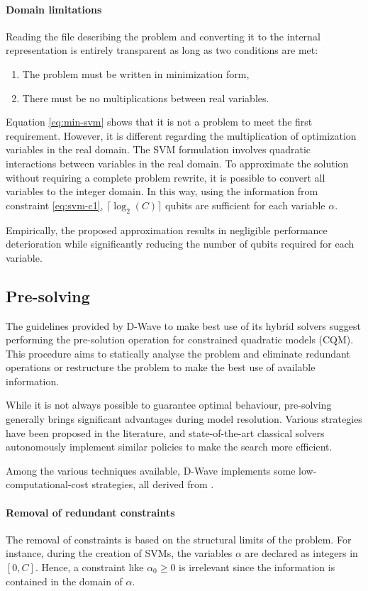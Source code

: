 \paragraph{Domain limitations} Reading the file describing the problem and converting it to the internal representation is entirely transparent as long as two conditions are met:
\begin{enumerate}
    \item The problem must be written in minimization form,
    \item There must be no multiplications between real variables.
\end{enumerate}
Equation \ref{eq:min-svm} shows that it is not a problem to meet the first requirement. However, it is different regarding the multiplication of optimization variables in the real domain. The SVM formulation involves quadratic interactions between variables in the real domain. To approximate the solution without requiring a complete problem rewrite, it is possible to convert all variables to the integer domain. In this way, using the information from constraint \ref{eq:svm-c1}, $\lceil\log_2(C)\rceil$ qubits are sufficient for each variable $\alpha$.

Empirically, the proposed approximation results in negligible performance deterioration while significantly reducing the number of qubits required for each variable.

\subsection{Pre-solving}

The guidelines provided by D-Wave to make best use of its hybrid solvers suggest performing the pre-solution operation for constrained quadratic models (CQM). This procedure aims to statically analyse the problem and eliminate redundant operations or restructure the problem to make the best use of available information.

While it is not always possible to guarantee optimal behaviour, pre-solving generally brings significant advantages during model resolution. Various strategies have been proposed in the literature, and state-of-the-art classical solvers autonomously implement similar policies to make the search more efficient.

Among the various techniques available, D-Wave implements some low-computational-cost strategies, all derived from \cite{PRESOLVE}.

\paragraph{Removal of redundant constraints} The removal of constraints is based on the structural limits of the problem. For instance, during the creation of SVMs, the variables $\alpha$ are declared as integers in $[0, C]$. Hence, a constraint like $\alpha_0 \geq 0$ is irrelevant since the information is contained in the domain of $\alpha$.

